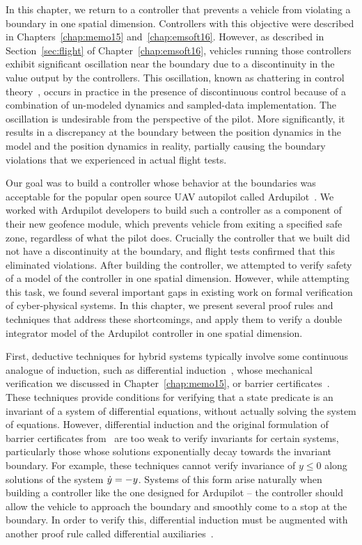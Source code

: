 In this chapter, we return to a controller that prevents a vehicle from
violating a boundary in one spatial dimension. Controllers with this
objective were described in Chapters~\ref{chap:memo15}
and~\ref{chap:emsoft16}. However, as described in Section~\ref{sec:flight}
of Chapter~\ref{chap:emsoft16}, vehicles running those controllers exhibit
significant oscillation near the boundary due to a discontinuity in the
value output by the controllers. This oscillation, known as chattering in
control theory~\cite{utkin06chatter}, occurs in practice in the presence of
discontinuous control because of a combination of un-modeled dynamics and
sampled-data implementation. The oscillation is undesirable from the
perspective of the pilot. More significantly, it results in a discrepancy
at the boundary between the position dynamics in the model and the position
dynamics in reality, partially causing the boundary violations that we
experienced in actual flight tests.

Our goal was to build a controller whose behavior at the boundaries was
acceptable for the popular open source UAV autopilot called
Ardupilot~\cite{ardupilot}. We worked with Ardupilot developers to build
such a controller as a component of their new geofence module, which
prevents vehicle from exiting a specified safe zone, regardless of what the
pilot does. Crucially the controller that we built did not have a
discontinuity at the boundary, and flight tests confirmed that this
eliminated violations. After building the controller, we attempted to
verify safety of a model of the controller in one spatial dimension.
However, while attempting this task, we found several important gaps in
existing work on formal verification of cyber-physical systems. In this
chapter, we present several proof rules and techniques that address these
shortcomings, and apply them to verify a double integrator model of the
Ardupilot controller in one spatial dimension.

First, deductive techniques for hybrid systems typically involve some
continuous analogue of induction, such as differential
induction~\cite{Platzer10DAL}, whose mechanical verification we
discussed in Chapter~\ref{chap:memo15}, or barrier
certificates~\cite{prajna04barrier}. These techniques provide conditions
for verifying that a state predicate is an invariant of a system of
differential equations, without actually solving the system of
equations. However, differential induction and the original formulation of
barrier certificates from~\cite{prajna04barrier} are too weak to verify
invariants for certain systems, particularly those whose solutions
exponentially decay towards the invariant boundary. For example, these
techniques cannot verify invariance of $y \leq 0$ along solutions of the
system $\dot{y} = -y$. Systems of this form arise naturally when building a
controller like the one designed for Ardupilot -- the controller should
allow the vehicle to approach the boundary and smoothly come to a stop at
the boundary. In order to verify this, differential induction must be
augmented with another proof rule called differential
auxiliaries~\cite{Platzer12diffcut}.

